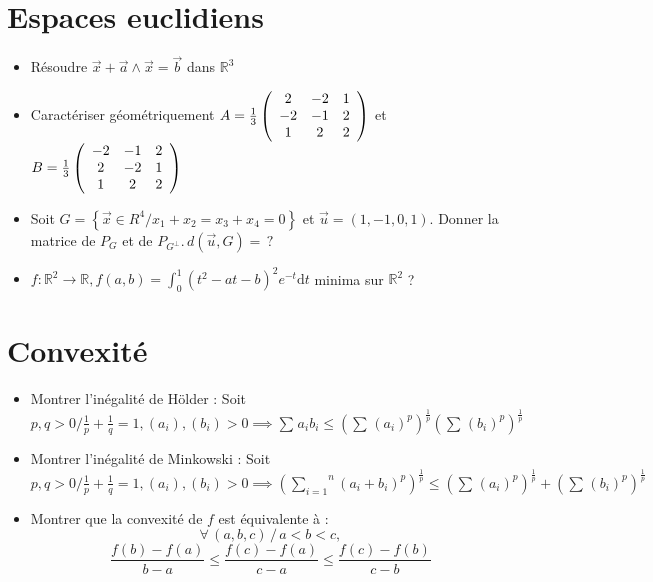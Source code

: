 \documentclass[a4paper, 11pt, french]{article}
\newcommand{\R}{\mathbb{R}}
\newcommand{\p}{\wedge}
\newcommand{\dt}{\mathrm{d}t}
\newcommand{\som}[2]{\overset{#2}{\underset{#1}{\sum}}}
\newcommand{\inv}[1]{\frac{1}{#1}}
\newcommand{\acc}[1]{\left\{ #1 \right\}}
\newcommand{\coeff}[2]{\dfrac{f\left(#1\right) - f\left(#2\right)}{#1-#2}}
\begin{document}
	\section*{Espaces euclidiens}
	\begin{itemize}
 		\item Résoudre $\vec{x}+\vec{a}\p \vec{x}=\vec{b}$ dans $\R^3$
		\item Caractériser géométriquement $A=\inv{3} \left( \begin{array}{c c c} 2 & -2 & 1 \\ -2 & -1 & 2 \\ 1 & 2 & 2 \end{array} \right)$ et $B=\inv{3} \left( \begin{array}{c c c} -2 & -1 & 2 \\ 2 & -2 & 1 \\ 1 & 2 & 2 \end{array} \right)$
		\item Soit $G=\acc{\vec{x} \in R^4 / x_1+x_2=x_3+x_4=0}$ et $\vec{u}=(1,-1,0,1).$ Donner la matrice de $P_G$ et de $P_{G^{\perp}}.  \, d(\vec{u},G) = \, ?$
		\item $f : \R^2 \rightarrow \R, f(a,b)=\int_0^1(t^2-at-b)^2e^{-t}\dt$ minima sur $\R^2$ ?
	\end{itemize}

	\section*{Convexité}
	\begin{itemize}
		\item Montrer l'inégalité de Hölder : Soit $p,q>0 / \inv{p}+\inv{q}=1, (a_i),(b_i)>0 \implies {\som{}{}a_ib_i \leqslant (\som{}{}(a_i)^p)^{\inv{p}}(\som{}{}(b_i)^p)^{\inv{p}}}$
		\item Montrer l'inégalité de Minkowski : Soit $p,q>0 / \inv{p}+\inv{q}=1, (a_i),(b_i)>0 \implies {(\som{i=1}{n}(a_i+b_i)^p)^{\inv{p}}\leqslant (\som{}{}(a_i)^p)^{\inv{p}} + (\som{}{}(b_i)^p)^{\inv{p}}}$
 		\item Montrer que la convexité de $f$ est équivalente à :
	\[\forall\,(a,b,c)\, /\, a<b<c,\]
	\begin{equation}
		\coeff{b}{a} \leqslant \coeff{c}{a} \leqslant \coeff{c}{b}
		\label{ineq}
	\end{equation}
	\end{itemize}
\end{document}
